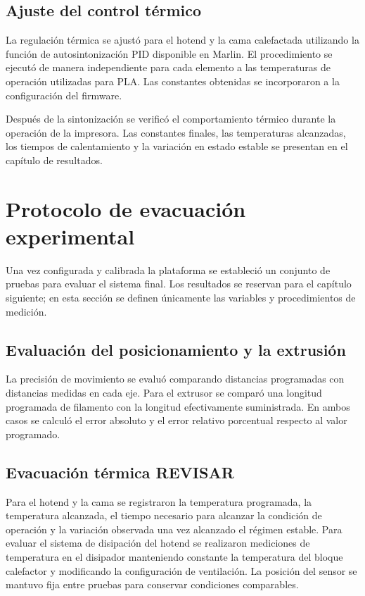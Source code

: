 \subsection{Ajuste del control térmico}
\label{sec:calibracion_termica}
La regulación térmica se ajustó para el hotend y la cama calefactada utilizando la función de autosintonización PID disponible en Marlin. El procedimiento se ejecutó de manera independiente para cada elemento a las temperaturas de operación utilizadas para PLA. Las constantes obtenidas se incorporaron a la configuración del firmware.

Después de la sintonización se verificó el comportamiento térmico durante la operación de la impresora. Las constantes finales, las temperaturas alcanzadas, los tiempos de calentamiento y la variación en estado estable se presentan en el capítulo de resultados.

\section{Protocolo de evacuación experimental}
Una vez configurada y calibrada la plataforma se estableció un conjunto de pruebas para evaluar el sistema final. Los resultados se reservan para el capítulo siguiente; en esta sección se definen únicamente las variables y procedimientos de medición.

\subsection{Evaluación del posicionamiento y la extrusión}
La precisión de movimiento se evaluó comparando distancias programadas con distancias medidas en cada eje. Para el extrusor se comparó una longitud programada de filamento con la longitud efectivamente suministrada. En ambos casos se calculó el error absoluto y el error relativo porcentual respecto al valor programado. 

\subsection{Evacuación térmica REVISAR}
Para el hotend y la cama se registraron la temperatura programada, la temperatura alcanzada, el tiempo necesario para alcanzar la condición de operación y la variación observada una vez alcanzado el régimen estable. Para evaluar el sistema de disipación del hotend se realizaron mediciones de temperatura en el disipador manteniendo constante la temperatura del bloque calefactor y modificando la configuración de ventilación. La posición del sensor se mantuvo fija entre pruebas para conservar condiciones comparables.

